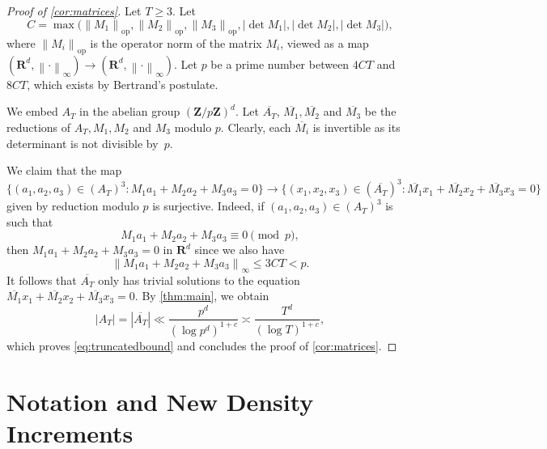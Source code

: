 \documentclass{daj}
\theoremstyle{definition}
\newcommand{\R}{\ensuremath{\mathbf{R}}}
\newcommand{\Z}{\ensuremath{\mathbf{Z}}}
\newcommand{\norm}[1]{\left\|#1\right\|}
\newcommand{\opnorm}[1]{\left\|#1\right\|_{\mathrm{op}}}
\begin{document}
\begin{proof}[Proof of \cref{cor:matrices}]
Let $T\geq 3$. Let 
\begin{equation*}
C = \max\big(\opnorm{M_1}, \opnorm{M_2}, \opnorm{M_3}, \lvert \det M_1\rvert, \lvert\det M_2\rvert, \lvert\det M_3\rvert\big),
\end{equation*}
where $\opnorm{M_i}$ is the operator norm of the matrix $M_i$, viewed as a map $(\R^d, \norm{\cdot}_{\infty}) \to (\R^d, \norm{\cdot}_{\infty})$. Let $p$ be a prime number between $4CT$ and $8 CT$, which exists by Bertrand's postulate.

We embed $A_T$ in the abelian group $(\Z/p\Z)^d$. Let $\overline{A_T}$, $\overline{M_1}, \overline{M_2}$ and $\overline{M_3}$ be the reductions of $A_T, M_1, M_2$ and $M_3$ modulo $p$. Clearly, each $\overline{M_i}$ is invertible as its determinant is not divisible by~$p$.

We claim that the map
\begin{equation*}
\{(a_1, a_2, a_3) \in (A_T)^3 : M_1a_1 + M_2a_2 + M_3a_3 = 0\} \to \{(x_1, x_2, x_3) \in (\overline{A_T})^3 : \overline{M_1}x_1 + \overline{M_2}x_2 + \overline{M_3}x_3 = 0\} 
\end{equation*}
given by reduction modulo $p$ is surjective. Indeed, if $(a_1, a_2, a_3)\in (A_T)^3$ is such that 
\begin{equation*}
M_1a_1 + M_2a_2 + M_3a_3 \equiv 0 \pmod{p},
\end{equation*}
then $M_1a_1 + M_2a_2 + M_3a_3 = 0$ in $\R^d$ since we also have
\begin{equation*}
\norm{M_1a_1 + M_2a_2 + M_3a_3}_{\infty} \leq 3CT < p.
\end{equation*}
It follows that $\overline{A_T}$ only has trivial solutions to the equation $\overline{M_1}x_1 + \overline{M_2}x_2 + \overline{M_3}x_3 = 0$. By \cref{thm:main}, we obtain
\begin{equation*}
|A_T| = |\overline{A_T}| \ll \frac{p^d}{(\log p^d)^{1+c}} \asymp \frac{T^d}{(\log T)^{1+c}},
\end{equation*}
which proves \cref{eq:truncatedbound} and concludes the proof of \cref{cor:matrices}.
\end{proof}








\section{Notation and New Density Increments}
\label{sec:notation}
\end{document}
